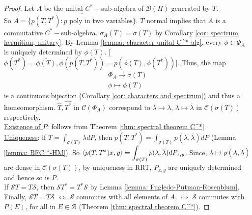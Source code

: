 \documentclass{article}
\begin{document}
\begin{proof}
    Let $A$ be the unital $C^*-$sub-algebra of $\mathcal{B}(H)$ generated by $T$.\\ 
    So $A = \overline{\{p(T, T^*): p \text{ poly in two variables}\}}$. $T$ normal implies that $A$ is a commutative $C^*-$sub-algebra. $\sigma_A(T)=\sigma(T)$ by Corollary \ref{cor: spectrum hermitian, unitary}. By Lemma \ref{lemma: character unital C^*-alg}, every $\phi\in \Phi_A$ is uniquely determined by $\phi(T)$. [$\phi(T^*)=\overline{\phi(T)}, \phi(p(T,T^*))=p(\phi(T), \phi(T^*))$]. Thus, the map 
    $$
    \begin{array}{cc}
        \Phi_A \to \sigma(T)\\
        \phi \mapsto \phi(T)
    \end{array}
    $$
    is a continuous bijection (Corollary \ref{cor: characters and spectrum}) and thus a homeomorphism. $\hat{T}, \widehat{T^*}$ in $\mathcal{C}(\Phi_A)$ correspond to $\lambda\mapsto \lambda$, $\lambda\mapsto \overline{\lambda}$ in $\mathcal{C}(\sigma(T))$ respectively.\\

    \noindent\underline{Existence of $P$}: follows from Theorem \ref{thm: spectral theorem C^*}.\\

    \noindent\underline{Uniqueness}: if $T = \displaystyle\int_{\sigma(T)} \lambda dP$, then 
    $p(T,T^*) = \displaystyle\int_{\sigma(T)} p(\lambda, \overline{\lambda}) dP$ (Lemma \ref{lemma: BFC *-HM}). So $\langle p(T,T^*)x, y\rangle=\displaystyle\int_{\sigma(T)} p(\lambda, \overline{\lambda}) dP_{x,y}$. Since, $\lambda\mapsto p(\lambda, \overline{\lambda})$ are dense in $\mathcal{C}(\sigma(T))$, by uniqueness in RRT, $P_{x,y}$ are uniquely determined and hence so is $P$. \\

    If $\mathcal{S}T = T\mathcal{S}$, then $\mathcal{S}T^* = T^*\mathcal{S}$ by Lemma \ref{lemma: Fugledo-Putman-Rosenblum}. Finally, 
    $\mathcal{S}T = T\mathcal{S}$ $\iff$ $\mathcal{S}$ commutes with all elements of $A$, $\iff$ $\mathcal{S}$ commutes with $P(E)$, for all in $E\in\mathcal{B}$ (Theorem \ref{thm: spectral theorem C^*}).
\end{proof}
\end{document}
